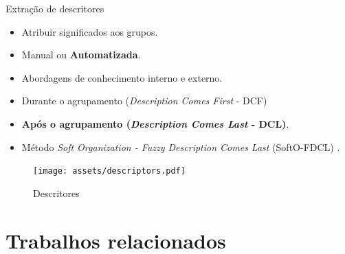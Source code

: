 \documentclass[brazil]{beamer}
\begin{document}
\begin{frame}{Extração de descritores}
  \begin{itemize}
    \item<1 -> Atribuir significados aos grupos. 
    \item<2 -> Manual ou \textbf{Automatizada}. 
    \item<3 -> Abordagens de conhecimento interno e externo.
    \item<4 -> Durante o agrupamento ({\it Description Comes First\/} - DCF) 
    \item<4 -> \textbf{Após o agrupamento ({\it Description Comes Last\/} - DCL)}.
    \item<5 -> Método {\it Soft Organization - Fuzzy Description Comes Last\/} (SoftO-FDCL)
      \cite{Nogueira2013}.
  \end{itemize} 
  \begin{figure}[!htp] 
    \centering 
    \texttt{[image: assets/descriptors.pdf]}
    \caption{Descritores} 
  \end{figure}
\end{frame}


\section{Trabalhos relacionados}
\end{document}
